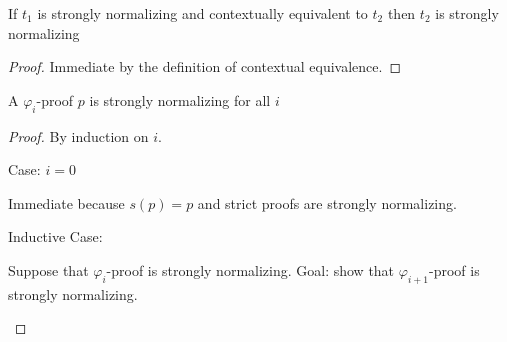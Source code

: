 \begin{lemma}
    If $t_1$ is strongly normalizing and contextually equivalent to $t_2$ then $t_2$ is strongly normalizing
\end{lemma}
\begin{proof}
    Immediate by the definition of contextual equivalence.
\end{proof}

\begin{theorem}
    A $\varphi_i$-proof $p$ is strongly normalizing for all $i$
\end{theorem}
\begin{proof}
    By induction on $i$.

    Case: $i = 0$
    \begin{proofcase}
        Immediate because $s(p) = p$ and strict proofs are strongly normalizing.
    \end{proofcase}

    Inductive Case:
    \begin{proofcase}
        Suppose that $\varphi_i$-proof is strongly normalizing.
        Goal: show that $\varphi_{i+1}$-proof is strongly normalizing.

    \end{proofcase}

\end{proof}
